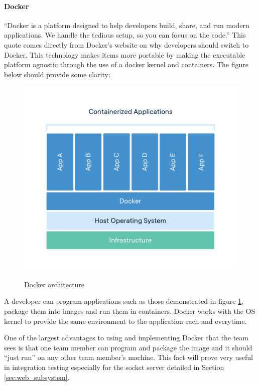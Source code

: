\paragraph{Docker}
``Docker is a platform designed to help developers build, share, and run modern applications. We handle the tedious setup, so you can focus on the code.'' This quote comes directly from Docker's website on why developers should switch to Docker. This technology makes items more portable by making the executable platform agnostic through the use of a docker kernel and containers. The figure below should provide some clarity:

\begin{figure}[H]
    \caption{Docker architecture}
    \centering
    \includegraphics[width=\textwidth]{images/Docker Architecture.png}
    \label{fig:docker_arch}
\end{figure}

A developer can program applications such as those demonstrated in figure \ref{fig:docker_arch}, package them into images and run them in containers. Docker works with the OS kernel to provide the same environment to the application each and everytime.

One of the largest advantages to using and implementing Docker that the team sees is that one team member can program and package the image and it should ``just run'' on any other team member's machine. This fact will prove very useful in integration testing especially for the socket server detailed in Section \ref{sec:web_subsystem}.

